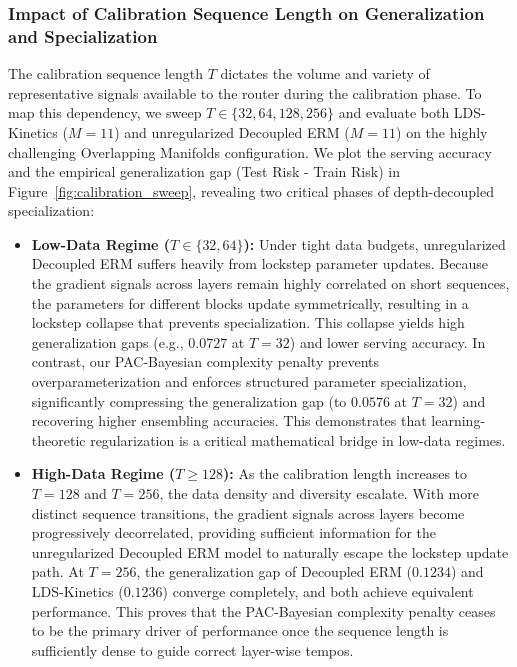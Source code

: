 \subsubsection{Impact of Calibration Sequence Length on Generalization and Specialization}
The calibration sequence length $T$ dictates the volume and variety of representative signals available to the router during the calibration phase. To map this dependency, we sweep $T \in \{32, 64, 128, 256\}$ and evaluate both LDS-Kinetics ($M=11$) and unregularized Decoupled ERM ($M=11$) on the highly challenging Overlapping Manifolds configuration. We plot the serving accuracy and the empirical generalization gap (Test Risk - Train Risk) in Figure~\ref{fig:calibration_sweep}, revealing two critical phases of depth-decoupled specialization:
\begin{itemize}
    \item \textbf{Low-Data Regime ($T \in \{32, 64\}$):} Under tight data budgets, unregularized Decoupled ERM suffers heavily from lockstep parameter updates. Because the gradient signals across layers remain highly correlated on short sequences, the parameters for different blocks update symmetrically, resulting in a lockstep collapse that prevents specialization. This collapse yields high generalization gaps (e.g., $0.0727$ at $T=32$) and lower serving accuracy. In contrast, our PAC-Bayesian complexity penalty prevents overparameterization and enforces structured parameter specialization, significantly compressing the generalization gap (to $0.0576$ at $T=32$) and recovering higher ensembling accuracies. This demonstrates that learning-theoretic regularization is a critical mathematical bridge in low-data regimes.
    \item \textbf{High-Data Regime ($T \ge 128$):} As the calibration length increases to $T=128$ and $T=256$, the data density and diversity escalate. With more distinct sequence transitions, the gradient signals across layers become progressively decorrelated, providing sufficient information for the unregularized Decoupled ERM model to naturally escape the lockstep update path. At $T=256$, the generalization gap of Decoupled ERM ($0.1234$) and LDS-Kinetics ($0.1236$) converge completely, and both achieve equivalent performance. This proves that the PAC-Bayesian complexity penalty ceases to be the primary driver of performance once the sequence length is sufficiently dense to guide correct layer-wise tempos.
\end{itemize}


